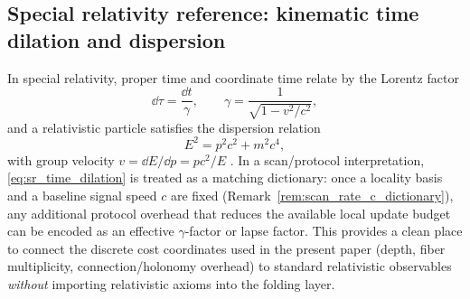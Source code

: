 \subsection{Special relativity reference: kinematic time dilation and dispersion}
\label{app:sr_time_dilation_dispersion}

In special relativity, proper time and coordinate time relate by the Lorentz factor
\begin{equation}
\label{eq:sr_time_dilation}
\dd\tau=\frac{\dd t}{\gamma},\qquad
\gamma=\frac{1}{\sqrt{1-v^2/c^2}},
\end{equation}
and a relativistic particle satisfies the dispersion relation
\begin{equation}
\label{eq:sr_dispersion}
E^2=p^2c^2+m^2c^4,
\end{equation}
with group velocity $v=\dd E/\dd p=pc^2/E$ \cite{Einstein1905,Rindler2006}.
In a scan/protocol interpretation, \eqref{eq:sr_time_dilation} is treated as a matching dictionary:
once a locality basis and a baseline signal speed $c$ are fixed (Remark~\ref{rem:scan_rate_c_dictionary}), any additional protocol overhead that reduces the available local update budget can be encoded as an effective $\gamma$-factor or lapse factor.
This provides a clean place to connect the discrete cost coordinates used in the present paper (depth, fiber multiplicity, connection/holonomy overhead) to standard relativistic observables \emph{without} importing relativistic axioms into the folding layer.


